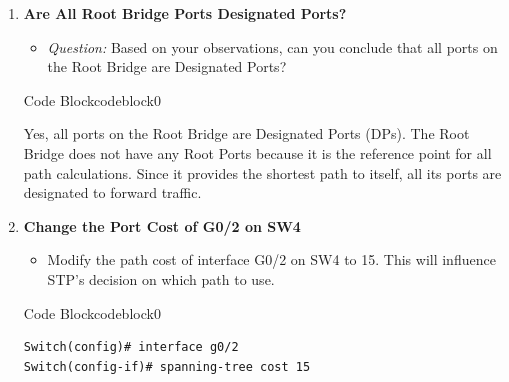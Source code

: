 \documentclass[a4paper]{book}
\begin{document}
\begin{enumerate}
\begin{ocg}{Code Block}{codeblock}{0}
\end{ocg}

    \item \textbf{Are All Root Bridge Ports Designated Ports?}
    \begin{itemize}
        \item \textit{Question:} Based on your observations, can you conclude that all ports on the Root Bridge are Designated Ports?
    \end{itemize}


\begin{ocg}{Code Block}{codeblock}{0}
\vspace{0.5cm}
\begin{tcolorbox}
\small{
    Yes, all ports on the Root Bridge are Designated Ports (DPs). The Root Bridge does not have any Root Ports because it is the reference point for all path calculations. Since it provides the shortest path to itself, all its ports are designated to forward traffic.
}
\end{tcolorbox}
\end{ocg}

    \item \textbf{Change the Port Cost of G0/2 on SW4}
    \begin{itemize}
        \item Modify the path cost of interface G0/2 on SW4 to 15. This will influence STP’s decision on which path to use. 
    \end{itemize}


\begin{ocg}{Code Block}{codeblock}{0}
\vspace{0.5cm}
\begin{lstlisting}
Switch(config)# interface g0/2
Switch(config-if)# spanning-tree cost 15

\end{lstlisting}


\end{ocg}
\end{enumerate}
\end{document}

